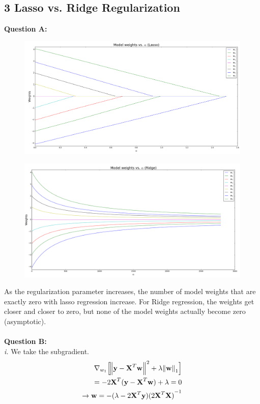 \documentclass[12 pt]{article}
\begin{document}
	\subsection*{3 Lasso vs. Ridge Regularization}
	\noindent\textbf{Question A:} 
	\begin{figure}[H]
	\includegraphics[width=14cm]{lasso_alpha}
	\end{figure}
	\begin{figure}[H]
	\includegraphics[width=14cm]{ridge_alpha}
	\end{figure}
	
	\noindent As the regularization parameter increases, the number of model weights that are exactly zero with lasso regression increase. For Ridge regression, the weights get closer and closer to zero, but none of the model weights actually become zero (asymptotic). \\ \\
	\noindent\textbf{Question B:} \\
	
	\noindent \textit{i.} We take the subgradient.
	\begin{eqnarray*}
		\nabla_{w_1} \Big[ \space{\norm{\textbf{y} - \textbf{X}^{T}\textbf{w}}^2 + \lambda\norm{\textbf{w}}_1}\Big] \\
		= -2\textbf{X}^T (\textbf{y} - \textbf{X}^{T}\textbf{w}) + \lambda = 0\\
		\rightarrow \textbf{w} = -(\lambda - 2 \textbf{X}^T\textbf{y}){(2\textbf{X}^T\textbf{X})}^{-1}
	\end{eqnarray*} 
\end{document}

